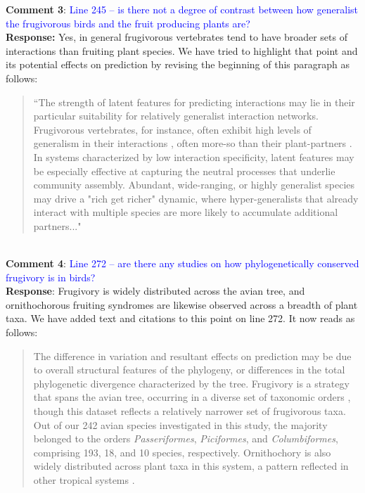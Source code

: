 \documentclass{article}
\begin{document}
\textbf{Comment 3}: \textcolor{blue}{Line 245 – is there not a degree of contrast between how generalist the frugivorous birds and the fruit producing plants are?} \\
\textbf{Response:} Yes, in general frugivorous vertebrates tend to have broader sets of interactions than fruiting plant species. We have tried to highlight that point and its potential effects on prediction by revising the beginning of this paragraph as follows:
\begin{quote}
    ``The strength of latent features for predicting interactions may lie in their particular suitability for relatively generalist interaction networks. Frugivorous vertebrates, for instance, often exhibit high levels of generalism in their interactions \cite{richardson2000plant}, often more-so than their plant-partners \cite{salazar2020frugivory}. In systems characterized by low interaction specificity, latent features may be especially effective at capturing the neutral processes that underlie community assembly. Abundant, wide-ranging, or highly generalist species may drive a "rich get richer" dynamic, where hyper-generalists that already interact with multiple species are more likely to accumulate additional partners..."
\end{quote}


\\
\textbf{Comment 4}: \textcolor{blue}{Line 272 – are there any studies on how phylogenetically conserved frugivory is in birds?} \\
    \textbf{Response}: Frugivory is widely distributed across the avian tree, and ornithochorous fruiting syndromes are likewise observed across a breadth of plant taxa. We have added text and citations to this point on line 272. It now reads as follows:
    \begin{quote}
The difference in variation and resultant effects on prediction may be due to overall structural features of the phylogeny, or differences in the total phylogenetic divergence characterized by the tree. Frugivory is a strategy that spans the avian tree, occurring in a diverse set of taxonomic orders \cite{daniel2009global}, though this dataset reflects a relatively narrower set of frugivorous taxa. Out of our 242 avian species investigated in this study, the majority belonged to the orders \textit{Passeriformes}, \textit{Piciformes}, and \textit{Columbiformes}, comprising 193, 18, and 10 species, respectively. Ornithochory is also widely distributed across plant taxa in this system, a pattern reflected in other tropical systems \cite{kuhlmann2016fruits, pizo2021frugivory}. 
    \end{quote}
\end{document}
